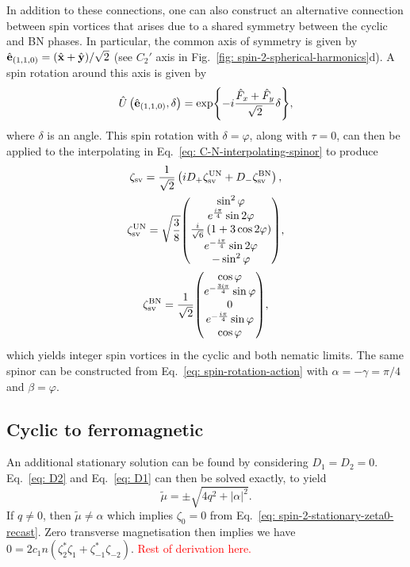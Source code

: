 In addition to these connections, one can also construct an alternative
connection between spin vortices that arises due to a shared symmetry between
the cyclic and BN phases.
In particular, the common axis of symmetry is given by \(\hat{\vb{e}}_{(1,1,0)}=
(\hat{\vb{x}} + \hat{\vb{y}}) / \sqrt{2}\) (see \(C_2'\) axis in
Fig.~\ref{fig: spin-2-spherical-harmonics}d).
A spin rotation around this axis is given by
\begin{equation}\label{eq: C-BN-sv-rot}
    \hat{U}\left(\hat{\vb{e}}_{(1,1,0)}, \delta\right) =
    \exp{-i\frac{\hat{F}_x + \hat{F}_y}{\sqrt{2}}\delta},
\end{equation}
where \(\delta \) is an angle.
This spin rotation with \(\delta = \varphi \), along with \(\tau=0\), can then
be applied to the interpolating in Eq.~\eqref{eq: C-N-interpolating-spinor} to
produce
\begin{gather}
    \zeta_\mathrm{sv} = \frac{1}{\sqrt{2}}\left(
    iD_+\zeta^\mathrm{UN}_\mathrm{sv} +
    D_-\zeta^\mathrm{BN}_\mathrm{sv}
    \right), \label{eq: C-BN-SV-SV-spinor} \\
    \zeta^\mathrm{UN}_\mathrm{sv} = \sqrt{\frac{3}{8}}
    \mqty(
    \sin^2 \varphi \\
    e^{\frac{i\pi }{4}} \sin 2\varphi \\
    \frac{i}{\sqrt{6}}\left(1 + 3\cos 2\varphi \right)\\
    e^{-\frac{i \pi }{4}} \sin2 \varphi \\
    -\sin^2 \varphi
    ), \\
    \zeta^\mathrm{BN}_\mathrm{sv} = \frac{1}{\sqrt{2}}
    \mqty(
    \cos \varphi \\
    e^{-\frac{3i\pi }{4}} \sin \varphi \\
    0\\
    e^{-\frac{i \pi }{4}} \sin \varphi \\
    \cos \varphi
    ),
\end{gather}
which yields integer spin vortices in the cyclic and both nematic limits.
The same spinor can be constructed from Eq.~\eqref{eq: spin-rotation-action}
with \(\alpha=-\gamma=\pi/4\) and \(\beta = \varphi \).

\subsection{Cyclic to ferromagnetic}
An additional stationary solution can be found by considering \(D_1=D_2=0\).
Eq.~\eqref{eq: D2} and Eq.~\eqref{eq: D1} can then be solved exactly, to yield
\begin{equation}
    \tilde{\mu} = \pm \sqrt{4q^2 + |\alpha|^2}.
\end{equation}
If \(q \neq 0\), then \(\tilde{\mu} \neq \alpha \) which implies \(\zeta_0=0\)
from Eq.~\eqref{eq: spin-2-stationary-zeta0-recast}.
Zero transverse magnetisation then implies we have
\(0 = 2c_1n(\zeta_2^*\zeta_{1} + \zeta_{-1}^*\zeta_{-2})\).
\textcolor{red}{Rest of derivation here.}

